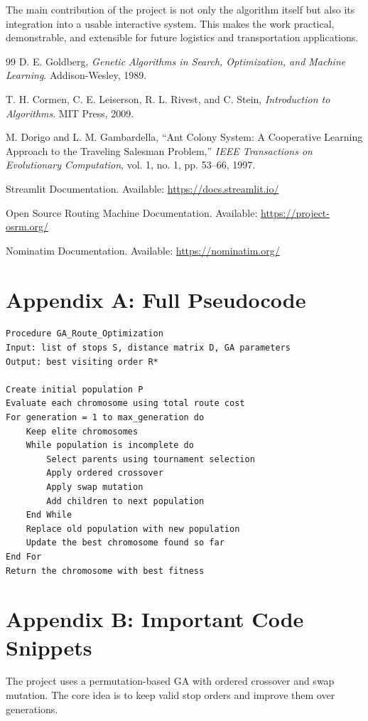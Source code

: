 The main contribution of the project is not only the algorithm itself but also its integration into a usable interactive system. This makes the work practical, demonstrable, and extensible for future logistics and transportation applications.

\begin{thebibliography}{99}
D. E. Goldberg, \textit{Genetic Algorithms in Search, Optimization, and Machine Learning}. Addison-Wesley, 1989.

T. H. Cormen, C. E. Leiserson, R. L. Rivest, and C. Stein, \textit{Introduction to Algorithms}. MIT Press, 2009.

M. Dorigo and L. M. Gambardella, ``Ant Colony System: A Cooperative Learning Approach to the Traveling Salesman Problem,'' \textit{IEEE Transactions on Evolutionary Computation}, vol. 1, no. 1, pp. 53--66, 1997.

Streamlit Documentation. Available: \url{https://docs.streamlit.io/}

Open Source Routing Machine Documentation. Available: \url{https://project-osrm.org/}

Nominatim Documentation. Available: \url{https://nominatim.org/}
\end{thebibliography}

\appendix
\section{Appendix A: Full Pseudocode}
\begin{verbatim}
Procedure GA_Route_Optimization
Input: list of stops S, distance matrix D, GA parameters
Output: best visiting order R*

Create initial population P
Evaluate each chromosome using total route cost
For generation = 1 to max_generation do
    Keep elite chromosomes
    While population is incomplete do
        Select parents using tournament selection
        Apply ordered crossover
        Apply swap mutation
        Add children to next population
    End While
    Replace old population with new population
    Update the best chromosome found so far
End For
Return the chromosome with best fitness
\end{verbatim}

\section{Appendix B: Important Code Snippets}
The project uses a permutation-based GA with ordered crossover and swap mutation. The core idea is to keep valid stop orders and improve them over generations.

